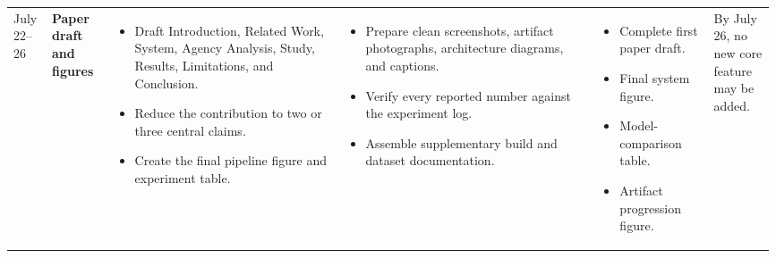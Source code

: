 \documentclass{article}
\begin{document}
\begin{landscape}
\begin{longtable}{
    L{0.05\linewidth}
    L{0.08\linewidth}
    L{0.3\linewidth}
    L{0.33\linewidth}
    L{0.15\linewidth}
    L{0.08\linewidth}
}
July 22--26
&
\textbf{Paper draft and figures}
&
\begin{itemize}[leftmargin=*,nosep]
    \item Draft Introduction, Related Work, System,
    Agency Analysis, Study, Results, Limitations, and Conclusion.
    \item Reduce the contribution to two or three central claims.
    \item Create the final pipeline figure and experiment table.
\end{itemize}
&
\begin{itemize}[leftmargin=*,nosep]
    \item Prepare clean screenshots, artifact photographs,
    architecture diagrams, and captions.
    \item Verify every reported number against the experiment log.
    \item Assemble supplementary build and dataset documentation.
\end{itemize}
&
\begin{itemize}[leftmargin=*,nosep]
    \item Complete first paper draft.
    \item Final system figure.
    \item Model-comparison table.
    \item Artifact progression figure.
\end{itemize}
&
By July 26, no new core feature may be added.
\\


\end{longtable}
\end{landscape}
\end{document}
